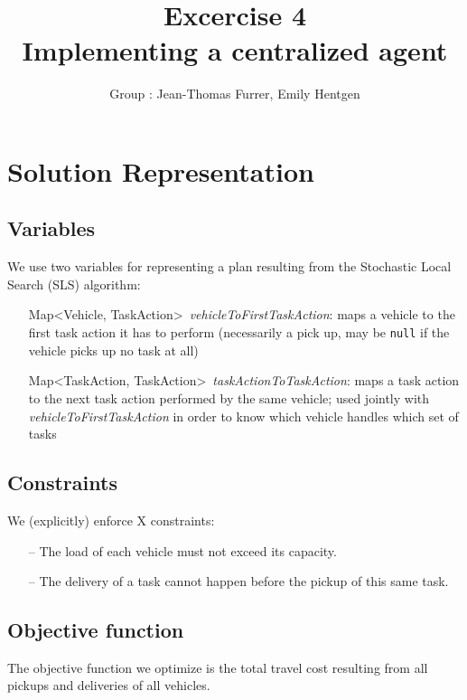 \documentclass[10pt]{article}
\title{\bf Excercise 4\\ Implementing a centralized agent}
\author{Group \textnumero 23: Jean-Thomas Furrer, Emily Hentgen}
\begin{document}
\maketitle

\section{Solution Representation}

\subsection{Variables}
We use two variables for representing a plan resulting from the Stochastic Local Search (SLS) algorithm:
\begin{itemize}
\item[]Map\textless Vehicle, TaskAction\textgreater\ \textit{vehicleToFirstTaskAction}: maps a vehicle to the first task action it has to perform (necessarily a pick up, may be \texttt{null} if the vehicle picks up no task at all)
\item[]Map\textless TaskAction, TaskAction\textgreater\ \textit{taskActionToTaskAction}: maps a task action to the next task action performed by the same vehicle; used jointly with \textit{vehicleToFirstTaskAction} in order to know which vehicle handles which set of tasks
\end{itemize}



\subsection{Constraints}
We (explicitly) enforce X constraints:
\begin{itemize}
\item[--] The load of each vehicle must not exceed its capacity.
\item[--] The delivery of a task cannot happen before the pickup of this same task.
\end{itemize}

\subsection{Objective function}
The objective function we optimize is the total travel cost resulting from all pickups and deliveries of all vehicles.
\end{document}
